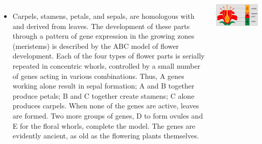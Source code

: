 \documentclass[11pt,dvipsnames,ignorenonframetext,aspectratio=169]{beamer}
\begin{document}
\begin{frame}{}
\protect\hypertarget{section-2}{}
\begin{columns}
\begin{itemize}
\footnotesize
\item Carpels, stamens, petals, and sepals, are homologous with and derived from leaves. The development of these parts through a pattern of gene expression in the growing zones (meristems) is described by the ABC model of flower development. Each of the four types of flower parts is serially repeated in concentric whorls, controlled by a small number of genes acting in various combinations. Thus, A genes working alone result in sepal formation; A and B together produce petals; B and C together create stamens; C alone produces carpels. When none of the genes are active, leaves are formed. Two more groups of genes, D to form ovules and E for the floral whorls, complete the model. The genes are evidently ancient, as old as the flowering plants themselves.
\end{itemize}


\includegraphics[width=0.98\linewidth]{../images/floral-parts-as-leaf-homologues} 

\end{columns}
\end{frame}
\end{document}
